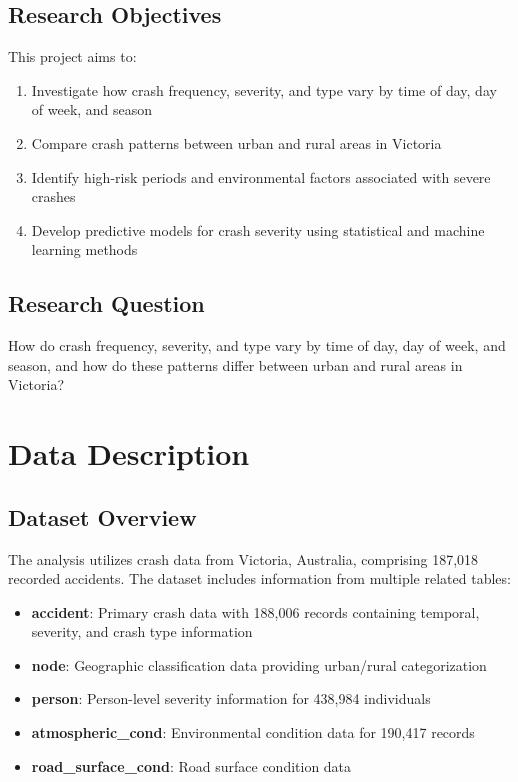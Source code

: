 \documentclass[12pt,a4paper]{article}
\begin{document}
\subsection{Research Objectives}
This project aims to:
\begin{enumerate}
    \item Investigate how crash frequency, severity, and type vary by time of day, day of week, and season
    \item Compare crash patterns between urban and rural areas in Victoria
    \item Identify high-risk periods and environmental factors associated with severe crashes
    \item Develop predictive models for crash severity using statistical and machine learning methods
\end{enumerate}

\subsection{Research Question}
How do crash frequency, severity, and type vary by time of day, day of week, and season, and how do these patterns differ between urban and rural areas in Victoria?

\section{Data Description}

\subsection{Dataset Overview}
The analysis utilizes crash data from Victoria, Australia, comprising 187,018 recorded accidents. The dataset includes information from multiple related tables:

\begin{itemize}
    \item \textbf{accident}: Primary crash data with 188,006 records containing temporal, severity, and crash type information
    \item \textbf{node}: Geographic classification data providing urban/rural categorization
    \item \textbf{person}: Person-level severity information for 438,984 individuals
    \item \textbf{atmospheric\_cond}: Environmental condition data for 190,417 records
    \item \textbf{road\_surface\_cond}: Road surface condition data
\end{itemize}
\end{document}
